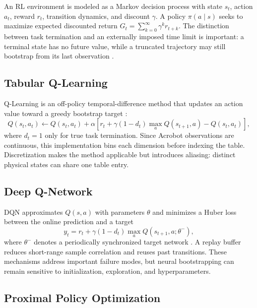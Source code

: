 \documentclass[11pt]{article}
\begin{document}
An RL environment is modeled as a Markov decision process with state $s_t$,
action $a_t$, reward $r_t$, transition dynamics, and discount $\gamma$. A policy
$\pi(a\mid s)$ seeks to maximize expected discounted return
$G_t=\sum_{k=0}^{\infty}\gamma^k r_{t+k}$. The distinction between task
termination and an externally imposed time limit is important: a terminal state
has no future value, while a truncated trajectory may still bootstrap from its
last observation \citep{sutton2018reinforcement,towers2024gymnasium}.

\subsection{Tabular Q-Learning}

Q-Learning is an off-policy temporal-difference method that updates an action
value toward a greedy bootstrap target \citep{watkins1992qlearning}:
\begin{equation}
Q(s_t,a_t)\leftarrow Q(s_t,a_t)+\alpha
\left[r_t+\gamma(1-d_t)\max_a Q(s_{t+1},a)-Q(s_t,a_t)\right],
\label{eq:qlearning}
\end{equation}
where $d_t=1$ only for true task termination. Since Acrobot observations are
continuous, this implementation bins each dimension before indexing the table.
Discretization makes the method applicable but introduces aliasing: distinct
physical states can share one table entry.

\subsection{Deep Q-Network}

DQN approximates $Q(s,a)$ with parameters $\theta$ and minimizes a Huber loss
between the online prediction and a target
\begin{equation}
y_t=r_t+\gamma(1-d_t)\max_a Q(s_{t+1},a;\theta^-),
\label{eq:dqn}
\end{equation}
where $\theta^-$ denotes a periodically synchronized target network
\citep{mnih2015human}. A replay buffer reduces short-range sample correlation and
reuses past transitions. These mechanisms address important failure modes, but
neural bootstrapping can remain sensitive to initialization, exploration, and
hyperparameters.

\subsection{Proximal Policy Optimization}
\end{document}
